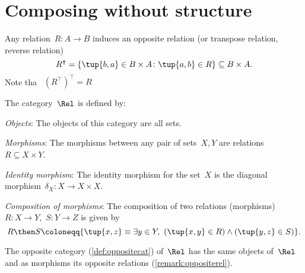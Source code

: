 \section{Composing without structure}

\begin{remark}
\label{remark:oppositerel}
Any relation~$R\colon A\to B$ induces an opposite relation (or transpose relation, reverse relation) \begin{equation}
    R^\intercal =\{\tup{b,a}\in B\times A\colon \tup{a,b}\in R\} \subseteq B\times A.
\end{equation}
Note tha~ $\left( R^\intercal\right)^\intercal = R$
\end{remark}

\begin{definition}
    The category~$\Rel$ is defined by:
    \begin{compactenum}
    \item \emph{Objects}: The objects of this category are all sets.
    \item \emph{Morphisms}: The morphisms between any pair of sets~$X, Y$
    are relations~$R\subseteq X\times Y$.
    \item \emph{Identity morphism}: The identity morphism for the set~$X$
    is the diagonal morphism~$\delta_X \colon X\to X\times X$.
    \item \emph{Composition of morphisms}: The composition of two relations (morphisms)~$R \colon X\to Y$,~$S\colon Y\to Z$ is given by
    \begin{equation}
    R \then S \coloneqq \{\tup{x,z} \equiv  \exists y \in Y, \ \left(\tup{x,y} \in R\right) \wedge \left(\tup{y,z} \in S\right)\}.
    \end{equation}
    \end{compactenum}
\end{definition}
\begin{remark}
The opposite category (\cref{def:oppositecat}) of~$\Rel$ has the same objects of~$\Rel$ and as morphisms its opposite relations (\cref{remark:oppositerel}).
\end{remark}

